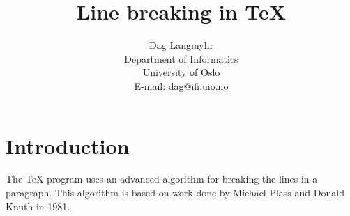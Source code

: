 \documentclass[12pt,a4paper,UKenglish]{article}
\title{Line breaking in \TeX}
\author{Dag Langmyhr\\ Department of Informatics\\
University of Oslo\\ E-mail: \url{dag@ifi.uio.no}}
\begin{document}
\maketitle
\section{Introduction}
The \TeX{}\cite{TeX-book} program uses an advanced
algorithm for breaking the lines in a paragraph.
This algorithm is based on work done by Michael
Plass\cite{Breaklines} and Donald Knuth in 1981.
\printbibliography
\end{document}
